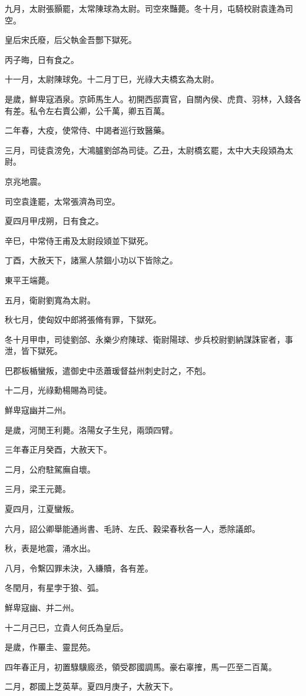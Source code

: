 \begin{pinyinscope}
九月，太尉張顥罷，太常陳球為太尉。司空來豔薨。冬十月，屯騎校尉袁逢為司空。

皇后宋氏廢，后父執金吾酆下獄死。

丙子晦，日有食之。

十一月，太尉陳球免。十二月丁巳，光祿大夫橋玄為太尉。

是歲，鮮卑寇酒泉。京師馬生人。初開西邸賣官，自關內侯、虎賁、羽林，入錢各有差。私令左右賣公卿，公千萬，卿五百萬。

二年春，大疫，使常侍、中謁者巡行致醫藥。

三月，司徒袁滂免，大鴻臚劉郃為司徒。乙丑，太尉橋玄罷，太中大夫段熲為太尉。

京兆地震。

司空袁逢罷，太常張濟為司空。

夏四月甲戌朔，日有食之。

辛巳，中常侍王甫及太尉段熲並下獄死。

丁酉，大赦天下，諸黨人禁錮小功以下皆除之。

東平王端薨。

五月，衛尉劉寬為太尉。

秋七月，使匈奴中郎將張脩有罪，下獄死。

冬十月甲申，司徒劉郃、永樂少府陳球、衛尉陽球、步兵校尉劉納謀誅宦者，事泄，皆下獄死。

巴郡板楯蠻叛，遣御史中丞蕭瑗督益州刺史討之，不剋。

十二月，光祿勳楊賜為司徒。

鮮卑寇幽并二州。

是歲，河閒王利薨。洛陽女子生兒，兩頭四臂。

三年春正月癸酉，大赦天下。

二月，公府駐駕廡自壞。

三月，梁王元薨。

夏四月，江夏蠻叛。

六月，詔公卿舉能通尚書、毛詩、左氏、穀梁春秋各一人，悉除議郎。

秋，表是地震，涌水出。

八月，令繫囚罪未決，入縑贖，各有差。

冬閏月，有星孛于狼、弧。

鮮卑寇幽、并二州。

十二月己巳，立貴人何氏為皇后。

是歲，作罼圭、靈昆苑。

四年春正月，初置騄驥廄丞，領受郡國調馬。豪右辜搉，馬一匹至二百萬。

二月，郡國上芝英草。夏四月庚子，大赦天下。


\end{pinyinscope}

